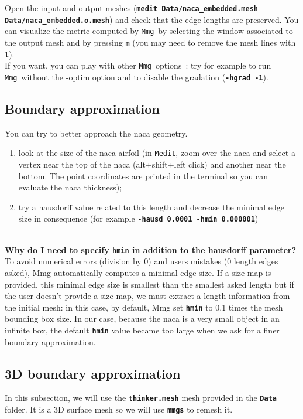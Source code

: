 \documentclass{article}
\newcommand{\ttb}[1]{\texttt{\textbf{#1}}}
\newcommand{\mmg}{\texttt{Mmg}}
\newcommand{\medit}{\texttt{Medit}}
\begin{document}
Open the input and output meshes (\ttb{medit Data/naca\_embedded.mesh
  Data/naca\_embedded.o.mesh}) and check that the edge lengths are
preserved. You can visualize the metric computed by \mmg\ by selecting
the window associated to the output mesh and by pressing \ttb{m} (you may need to
remove the mesh lines with \ttb{l}).\\

If you want, you can play with other \mmg\ options~: try for example
to run \mmg\ without the -optim option and to disable the gradation
(\ttb{-hgrad -1}).

\subsection{Boundary approximation}
You can try to better approach the naca geometry.
\begin{enumerate}
\item look at the size of the naca airfoil (in \medit, zoom over the
naca and select a vertex near the top of the naca (alt+shift+left
click) and another near the bottom. The point coordinates are printed
in the terminal so you can evaluate the naca thickness);
\item try a hausdorff value related to this length and decrease the minimal edge
size in consequence (for example \ttb{-hausd 0.0001 -hmin 0.000001})
\end{enumerate}

\textbf{\\Why do I need to specify \ttb{hmin} in addition to the hausdorff parameter?\\}
To avoid numerical errors (division by 0) and users mistakes (0 length
edges asked), Mmg automatically computes a minimal edge size. If a
size map is provided, this minimal edge size is smallest than the
smallest asked length but if the user doesn't provide a size map, we
must extract a length information from the initial mesh: in this case,
by default, Mmg set \ttb{hmin} to 0.1 times the mesh bounding box
size. In our case, because the naca is a very small object in an
infinite box, the default \ttb{hmin} value became too large when we
ask for a finer boundary approximation.

\subsection{3D boundary approximation}
In this subsection, we will use the \ttb{thinker.mesh} mesh provided
in the \ttb{Data} folder. It is a 3D surface mesh so we will use
\ttb{mmgs} to remesh it.
\end{document}
